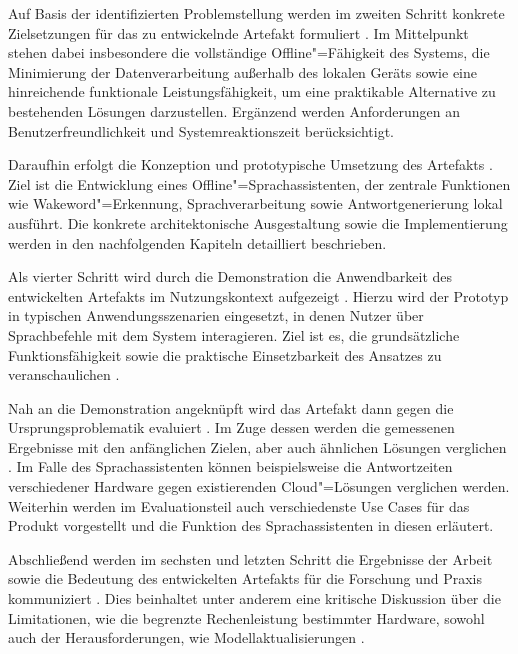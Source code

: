 Auf Basis der identifizierten Problemstellung werden im zweiten Schritt konkrete Zielsetzungen für das zu entwickelnde Artefakt formuliert \autocite{designScienceResearchMethodology}. Im Mittelpunkt stehen dabei insbesondere die vollständige Offline"=Fähigkeit des Systems, die Minimierung der Datenverarbeitung außerhalb des lokalen Geräts sowie eine hinreichende funktionale Leistungsfähigkeit, um eine praktikable Alternative zu bestehenden Lösungen darzustellen. Ergänzend werden Anforderungen an Benutzerfreundlichkeit und Systemreaktionszeit berücksichtigt.

Daraufhin erfolgt die Konzeption und prototypische Umsetzung des Artefakts \autocite{designScienceResearchMethodology}. Ziel ist die Entwicklung eines Offline"=Sprachassistenten, der zentrale Funktionen wie Wakeword"=Erkennung, Sprachverarbeitung sowie Antwortgenerierung lokal ausführt. Die konkrete architektonische Ausgestaltung sowie die Implementierung werden in den nachfolgenden Kapiteln detailliert beschrieben.

Als vierter Schritt wird durch die Demonstration die Anwendbarkeit des entwickelten Artefakts im Nutzungskontext aufgezeigt \autocite{designScienceResearchMethodology}. Hierzu wird der Prototyp in typischen Anwendungsszenarien eingesetzt, in denen Nutzer über Sprachbefehle mit dem System interagieren. Ziel ist es, die grundsätzliche Funktionsfähigkeit sowie die praktische Einsetzbarkeit des Ansatzes zu veranschaulichen \autocite{designScienceResearchInformation}.

Nah an die Demonstration angeknüpft wird das Artefakt dann gegen die Ursprungsproblematik evaluiert \autocite{designScienceResearchMethodology}.  Im Zuge dessen werden die gemessenen Ergebnisse mit den anfänglichen Zielen, aber auch ähnlichen Lösungen verglichen \autocite{designScienceResearchMethodology}. Im Falle des Sprachassistenten können beispielsweise die Antwortzeiten verschiedener Hardware gegen existierenden Cloud"=Lösungen verglichen werden. Weiterhin werden im Evaluationsteil auch verschiedenste Use Cases für das Produkt vorgestellt und die Funktion des Sprachassistenten in diesen erläutert.

Abschließend werden im sechsten und letzten Schritt die Ergebnisse der Arbeit sowie die Bedeutung des entwickelten Artefakts für die Forschung und Praxis kommuniziert \autocite{designScienceResearchMethodology}. Dies beinhaltet unter anderem eine kritische Diskussion über die Limitationen, wie die begrenzte Rechenleistung bestimmter Hardware, sowohl auch der Herausforderungen, wie Modellaktualisierungen \autocite{designScienceResearchInformation}.


